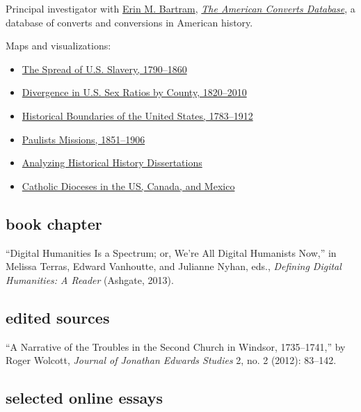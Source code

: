 \documentclass[11pt]{article}
\begin{document}
Principal investigator with
\href{http://history.uconn.edu/doctoral-students/erin-m-bartram/}{Erin
M. Bartram}, \emph{\href{http://americanconverts.org}{The American
Converts Database}}, a database of converts and conversions in American
history.

Maps and visualizations:

\begin{itemize}
\item
  \href{http://lincolnmullen.com/projects/slavery/}{The Spread of U.S.
  Slavery, 1790--1860}
\item
  \href{http://lincolnmullen.com/projects/sex-ratios/}{Divergence in
  U.S. Sex Ratios by County, 1820--2010}
\item
  \href{http://lincolnmullen.com/projects/us-boundaries/}{Historical
  Boundaries of the United States, 1783--1912}
\item
  \href{http://lincolnmullen.com/projects/paulists-map/}{Paulists
  Missions, 1851--1906}
\item
  \href{http://lincolnmullen.com/research/history-dissertations/}{Analyzing
  Historical History Dissertations}
\item
  \href{http://lincolnmullen.com/blog/maps-of-catholic-dioceses-in-the-us-canada-and-mexico-take-two/}{Catholic
  Dioceses in the US, Canada, and Mexico}
\end{itemize}

\subsection{book chapter}\label{book-chapter}

``Digital Humanities Is a Spectrum; or, We're All Digital Humanists
Now,'' in Melissa Terras, Edward Vanhoutte, and Julianne Nyhan, eds.,
\emph{Defining Digital Humanities: A Reader} (Ashgate, 2013).

\subsection{edited sources}\label{edited-sources}

``A Narrative of the Troubles in the Second Church in Windsor,
1735--1741,'' by Roger Wolcott, \emph{Journal of Jonathan Edwards
Studies} 2, no. 2 (2012): 83--142.

\subsection{selected online essays}\label{selected-online-essays}
\end{document}
